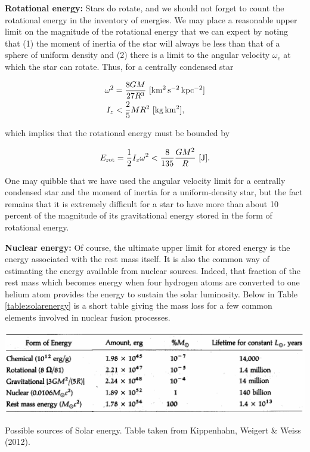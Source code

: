\documentclass[a4paper,10pt]{article}
\begin{document}
{\noindent}\textbf{Rotational energy:} Stars do rotate, and we should not forget to count the rotational energy in the inventory of energies. We may place a reasonable upper limit on the magnitude of the rotational energy that we can expect by noting that (1) the moment of inertia of the star will always be less than that of a sphere of uniform density and (2) there is a limit to the angular velocity $\omega_c$ at which the star can rotate. Thus, for a centrally condensed star

\begin{align*}
    \omega^2 &= \frac{8GM}{27R^3} ~ [{\rm km^2\,s^{-2}\,kpc^{-2}}] \\
    I_z &< \frac{2}{5}MR^2 ~ [{\rm kg\,km^2}],
\end{align*}

{\noindent}which implies that the rotational energy must be bounded by

\begin{align*}
    E_{\rm rot} = \frac{1}{2}I_z\omega^2 < \frac{8}{135}\frac{GM^2}{R} ~ [{\rm J}].
\end{align*}

{\noindent}One may quibble that we have used the angular velocity limit for a centrally condensed star and the moment of inertia for a uniform-density star, but the fact remains that it is extremely difficult for a star to have more than about 10 percent of the magnitude of its gravitational energy stored in the form of rotational energy.

{\noindent}\textbf{Nuclear energy:} Of course, the ultimate upper limit for stored energy is the energy associated with the rest mass itself. It is also the common way of estimating the energy available from nuclear sources. Indeed, that fraction of the rest mass which becomes energy when four hydrogen atoms are converted to one helium atom provides the energy to sustain the solar luminosity. Below in Table \ref{table:solarenergy} is a short table giving the mass loss for a few common elements involved in nuclear fusion processes.

\begin{table}[h]
    \centering
    \includegraphics[width=14cm]{figures/SolarEnergy.png}
    \caption{\footnotesize{Possible sources of Solar energy. Table taken from Kippenhahn, Weigert \& Weiss (2012).}}
    \label{table:solarenergy}
\end{table}
\end{document}
